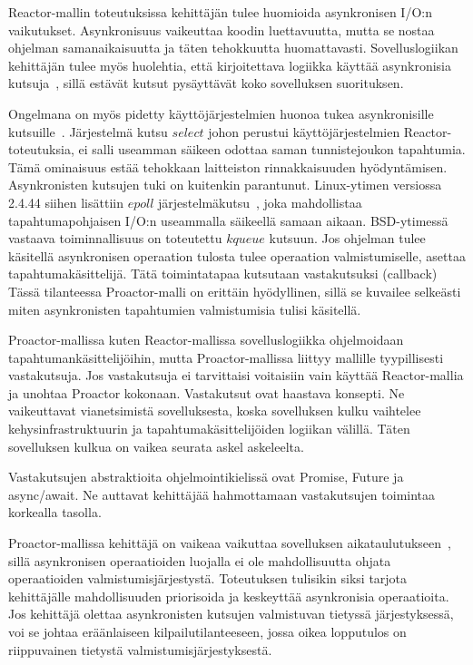 \documentclass[finnish]{tktltiki2}
\theoremstyle{definition}
\theoremstyle{remark}
\begin{document}
Reactor-mallin toteutuksissa kehittäjän tulee huomioida
asynkronisen I/O:n vaikutukset. Asynkronisuus vaikeuttaa koodin
luettavuutta, mutta se nostaa ohjelman samanaikaisuutta ja täten
tehokkuutta huomattavasti. Sovelluslogiikan kehittäjän
tulee myös huolehtia, että kirjoitettava logiikka
käyttää asynkronisia kutsuja~\cite{pyarali_proactor_1997}, sillä estävät
kutsut pysäyttävät koko sovelluksen suorituksen.

Ongelmana on myös pidetty käyttöjärjestelmien huonoa
tukea asynkronisille kutsuille~\cite{pyarali_proactor_1997}. Järjestelmä kutsu
$select$ johon perustui käyttöjärjestelmien Reactor-toteutuksia,
ei salli useamman säikeen odottaa saman tunnistejoukon tapahtumia.
Tämä ominaisuus estää tehokkaan laitteiston rinnakkaisuuden hyödyntämisen.
Asynkronisten kutsujen tuki on kuitenkin parantunut.
Linux-ytimen versiossa
2.4.44 siihen lisättiin $epoll$ järjestelmäkutsu~\cite{man_epoll}, joka
mahdollistaa tapahtumapohjaisen I/O:n useammalla säikeellä
samaan aikaan. BSD-ytimessä vastaava toiminnallisuus on toteutettu $kqueue$
kutsuun.
Jos ohjelman tulee käsitellä
asynkronisen operaation tulosta tulee operaation valmistumiselle,
asettaa tapahtumakäsittelijä. Tätä toimintatapaa kutsutaan vastakutsuksi (callback)
Tässä tilanteessa Proactor-malli on erittäin hyödyllinen, sillä se
kuvailee selkeästi miten asynkronisten tapahtumien valmistumisia tulisi käsitellä.

Proactor-mallissa kuten Reactor-mallissa sovelluslogiikka ohjelmoidaan 
tapahtumankäsittelijöihin, mutta Proactor-mallissa liittyy 
mallille tyypillisesti vastakutsuja. Jos vastakutsuja ei tarvittaisi
voitaisiin vain käyttää Reactor-mallia ja unohtaa Proactor kokonaan.
Vastakutsut ovat haastava konsepti. Ne vaikeuttavat vianetsimistä
sovelluksesta, koska sovelluksen kulku vaihtelee kehysinfrastruktuurin
ja tapahtumakäsittelijöiden logiikan välillä. Täten sovelluksen 
kulkua on vaikea seurata askel askeleelta.

Vastakutsujen abstraktioita ohjelmointikielissä ovat Promise, Future ja
async/await. Ne auttavat kehittäjää hahmottamaan vastakutsujen 
toimintaa korkealla tasolla.

Proactor-mallissa kehittäjä on vaikeaa vaikuttaa sovelluksen
aikataulutukseen~\cite{pyarali_proactor_1997},
sillä asynkronisen operaatioiden luojalla
ei ole mahdollisuutta ohjata operaatioiden valmistumisjärjestystä.
Toteutuksen tulisikin siksi tarjota kehittäjälle mahdollisuuden
priorisoida ja keskeyttää asynkronisia operaatioita.
Jos kehittäjä olettaa asynkronisten kutsujen valmistuvan tietyssä järjestyksessä,
voi se johtaa eräänlaiseen kilpailutilanteeseen, jossa
oikea lopputulos on riippuvainen tietystä valmistumisjärjestyksestä.
\end{document}
